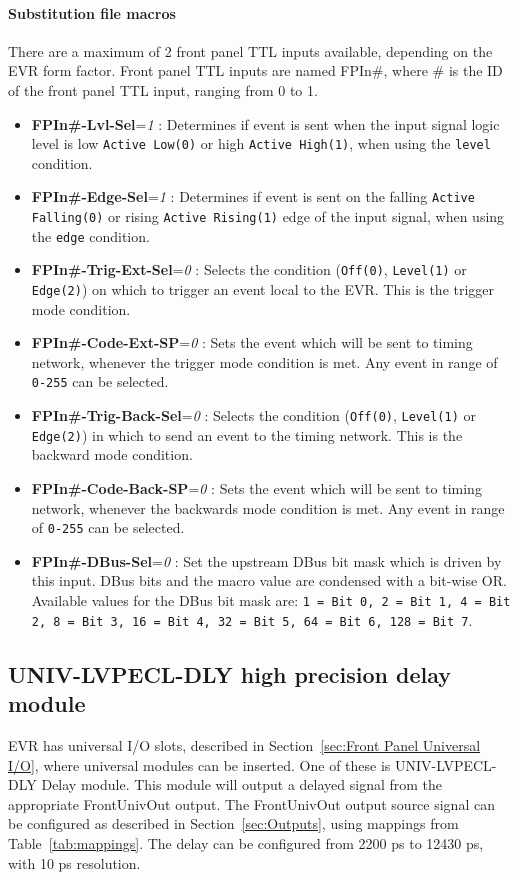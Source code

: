 \documentclass[12pt,a4paper]{article}
\begin{document}
\paragraph{Substitution file macros}
There are a maximum of 2 front panel TTL inputs available, depending on the EVR form factor. Front panel TTL inputs are named FPIn\#, where \# is the ID of the front panel TTL input, ranging from 0 to 1.
\begin{itemize}
  \item
    \textbf{FPIn\#-Lvl-Sel}=\emph{1} : Determines if event is sent when the input signal logic level is low \texttt{Active Low(0)} or high \texttt{Active High(1)}, when using the \texttt{level} condition.
  \item
    \textbf{FPIn\#-Edge-Sel}=\emph{1} : Determines if event is sent on the falling \texttt{Active Falling(0)} or rising \texttt{Active Rising(1)} edge of the input signal, when using the \texttt{edge} condition.
  \item
    \textbf{FPIn\#-Trig-Ext-Sel}=\emph{0} : Selects the condition (\texttt{Off(0)}, \texttt{Level(1)} or \texttt{Edge(2)}) on which to trigger an event local to the EVR. This is the trigger mode condition.
  \item
    \textbf{FPIn\#-Code-Ext-SP}=\emph{0} : Sets the event which will be sent to timing network, whenever the trigger mode condition is met. Any event in range of \texttt{0-255} can be selected.
  \item
    \textbf{FPIn\#-Trig-Back-Sel}=\emph{0} : Selects the condition (\texttt{Off(0)}, \texttt{Level(1)} or \texttt{Edge(2)}) in which to send an event to the timing network. This is the backward mode condition.
  \item
    \textbf{FPIn\#-Code-Back-SP}=\emph{0} : Sets the event which will be sent to timing network, whenever the backwards mode condition is met. Any event in range of \texttt{0-255} can be selected.
  \item
    \textbf{FPIn\#-DBus-Sel}=\emph{0} : Set the upstream DBus bit mask which is driven by this input. DBus bits and the macro value are condensed with a bit-wise OR. Available values for the DBus bit mask are: \texttt{1 = Bit 0, 2 = Bit 1, 4 = Bit 2, 8 = Bit 3, 16 = Bit 4, 32 = Bit 5, 64 = Bit 6, 128 = Bit 7}.
  \end{itemize}
  
  

\subsection{UNIV-LVPECL-DLY high precision delay module}\label{sec:UNIV-LVPECL-DLY}
EVR has universal I/O slots, described in Section~\ref{sec:Front Panel Universal I/O}, where universal modules can be inserted. One of these is UNIV-LVPECL-DLY Delay module. This module will output a delayed signal from the appropriate FrontUnivOut output. The FrontUnivOut output source signal can be configured as described in Section~\ref{sec:Outputs}, using mappings from Table~\ref{tab:mappings}. The delay can be configured from 2200 ps to 12430 ps, with 10 ps resolution. 
\end{document}
